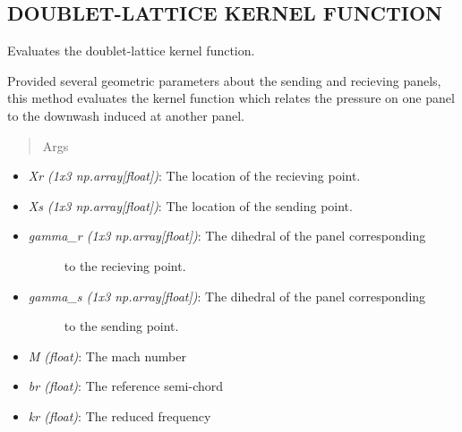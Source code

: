 \documentclass[letterpaper,10pt,english]{sphinxmanual}
\begin{document}
\subsection{DOUBLET-LATTICE KERNEL FUNCTION}
\label{aerodynamics:doublet-lattice-kernel-function}

\begin{fulllineitems}
\label{aerodynamics:AeroComBAT.Aerodynamics.K}
Evaluates the doublet-lattice kernel function.

Provided several geometric parameters about the sending and recieving
panels, this method evaluates the kernel function which relates the
pressure on one panel to the downwash induced at another panel.
\begin{quote}\begin{description}
\item[{Args}] \leavevmode
\end{description}\end{quote}
\begin{itemize}
\item {} 
\emph{Xr (1x3 np.array{[}float{]})}: The location of the recieving point.

\item {} 
\emph{Xs (1x3 np.array{[}float{]})}: The location of the sending point.

\item {} \begin{description}
\item[{\emph{gamma\_r (1x3 np.array{[}float{]})}: The dihedral of the panel corresponding}] \leavevmode
to the recieving point.

\end{description}

\item {} \begin{description}
\item[{\emph{gamma\_s (1x3 np.array{[}float{]})}: The dihedral of the panel corresponding}] \leavevmode
to the sending point.

\end{description}

\item {} 
\emph{M (float)}: The mach number

\item {} 
\emph{br (float)}: The reference semi-chord

\item {} 
\emph{kr (float)}: The reduced frequency


\end{itemize}
\end{fulllineitems}
\end{document}
